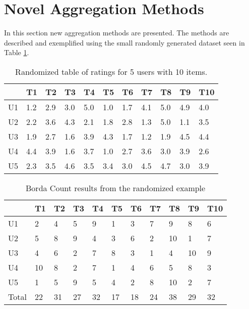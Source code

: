 \section{Novel Aggregation Methods} \label{sec:novelaggregationmethods}
In this section new aggregation methods are presented. The methods are described and exemplified using the small randomly generated dataset seen in Table \ref{tbl:randomratingstable}.

\begin{table}[H]
	\centering
	\begin{tabular}{|l|l|l|l|l|l|l|l|l|l|l|}
		\hline
		& T1  & T2  & T3  & T4  & T5  & T6  & T7  & T8  & T9  & T10 \\ \hline
		U1 & 1.2 & 2.9 & 3.0 & 5.0 & 1.0 & 1.7 & 4.1 & 5.0 & 4.9 & 4.0 \\ \hline
		U2 & 2.2 & 3.6 & 4.3 & 2.1 & 1.8 & 2.8 & 1.3 & 5.0 & 1.1 & 3.5 \\ \hline
		U3 & 1.9 & 2.7 & 1.6 & 3.9 & 4.3 & 1.7 & 1.2 & 1.9 & 4.5 & 4.4 \\ \hline
		U4 & 4.4 & 3.9 & 1.6 & 3.7 & 1.0 & 2.7 & 3.6 & 3.0 & 3.9 & 2.6 \\ \hline
		U5 & 2.3 & 3.5 & 4.6 & 3.5 & 3.4 & 3.0 & 4.5 & 4.7 & 3.0 & 3.9 \\ \hline
	\end{tabular}
	\caption{Randomized table of ratings for 5 users with 10 items.}
	\label{tbl:randomratingstable}
\end{table}


\begin{table}[H]
	\centering
	\begin{tabular}{|l|l|l|l|l|l|l|l|l|l|l|}
		\hline
		& T1 & T2 & T3 & T4 & T5 & T6 & T7 & T8 & T9 & T10 \\ \hline
		U1    & 2  & 4  & 5  & 9  & 1  & 3  & 7  & 9  & 8  & 6   \\ \hline
		U2    & 5  & 8  & 9  & 4  & 3  & 6  & 2  & 10 & 1  & 7   \\ \hline
		U3    & 4  & 6  & 2  & 7  & 8  & 3  & 1  & 4  & 10 & 9   \\ \hline
		U4    & 10 & 8  & 2  & 7  & 1  & 4  & 6  & 5  & 8  & 3   \\ \hline
		U5    & 1  & 5  & 9  & 5  & 4  & 2  & 8  & 10 & 2  & 7   \\ \hline
		Total & 22 & 31 & 27 & 32 & 17 & 18 & 24 & 38 & 29 & 32  \\ \hline
	\end{tabular}
	\caption{Borda Count results from the randomized example}
	\label{tbl:bordacount}
\end{table}

